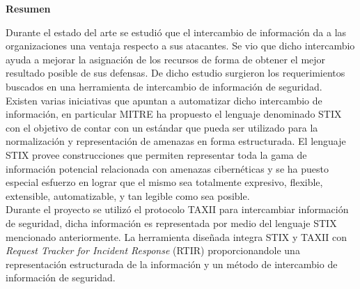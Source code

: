 {\huge \bfseries Resumen \\[0.4cm]}

Durante el estado del arte se estudió que el intercambio de información da a las organizaciones una ventaja respecto a sus atacantes. Se vio que dicho intercambio ayuda a mejorar la asignación de los recursos de forma de obtener el mejor resultado posible de sus defensas. De dicho estudio surgieron los requerimientos buscados en una herramienta de intercambio de información de seguridad. \\

Existen varias iniciativas que apuntan a automatizar dicho intercambio de información, en particular MITRE \cite{mitre} ha propuesto el lenguaje denominado STIX con el objetivo de contar con un estándar que pueda ser utilizado para la normalización y representación  de amenazas en forma estructurada. El lenguaje STIX provee construcciones que permiten representar  toda la gama de información potencial relacionada con amenazas cibernéticas y se ha puesto especial esfuerzo en lograr que el mismo sea totalmente expresivo, flexible, extensible, automatizable, y tan legible como sea posible.\\
 
Durante el proyecto se utilizó el protocolo TAXII para intercambiar información de seguridad, dicha información es representada por medio del lenguaje STIX mencionado anteriormente. La herramienta diseñada integra STIX y TAXII con \textit{Request Tracker  for Incident Response} (RTIR) proporcionandole una representación estructurada de la información y un método de intercambio de información de seguridad.

